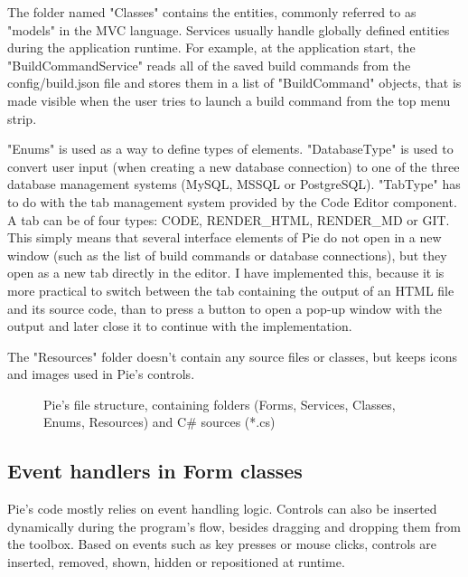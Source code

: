 The folder named "Classes" contains the entities, commonly referred to as "models" in the MVC language. Services usually handle globally defined entities during the application runtime. For example, at the application start, the "BuildCommandService" reads all of the saved build commands from the config/build.json file and stores them in a list of "BuildCommand" objects, that is made visible when the user tries to launch a build command from the top menu strip.

"Enums" is used as a way to define types of elements. "DatabaseType" is used to convert user input (when creating a new database connection) to one of the three database management systems (MySQL, MSSQL or PostgreSQL). "TabType" has to do with the tab management system provided by the Code Editor component. A tab can be of four types: CODE, RENDER\_HTML, RENDER\_MD or GIT. This simply means that several interface elements of Pie do not open in a new window (such as the list of build commands or database connections), but they open as a new tab directly in the editor. I have implemented this, because it is more practical to switch between the tab containing the output of an HTML file and its source code, than to press a button to open a pop-up window with the output and later close it to continue with the implementation.

The "Resources" folder doesn't contain any source files or classes, but keeps icons and images used in Pie's controls. 

\begin{figure}
\centering
{}
\caption{Pie's file structure, containing folders (Forms, Services, Classes, Enums, Resources) and C\# sources (*.cs)}
\end{figure}

\subsection{Event handlers in Form classes}

Pie's code mostly relies on event handling logic. Controls can also be inserted dynamically during the program's flow, besides dragging and dropping them from the toolbox. Based on events such as key presses or mouse clicks, controls are inserted, removed, shown, hidden or repositioned at runtime.